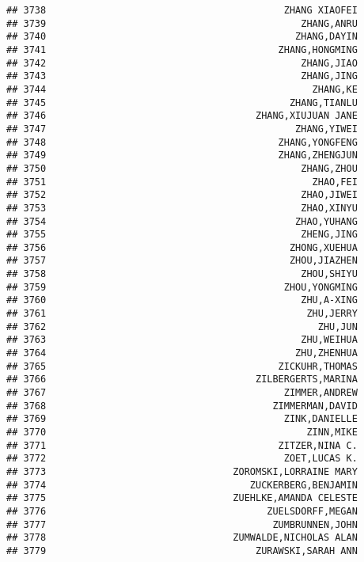 \documentclass[
]{article}
\begin{document}
\begin{verbatim}
## 3738                                          ZHANG XIAOFEI
## 3739                                             ZHANG,ANRU
## 3740                                            ZHANG,DAYIN
## 3741                                         ZHANG,HONGMING
## 3742                                             ZHANG,JIAO
## 3743                                             ZHANG,JING
## 3744                                               ZHANG,KE
## 3745                                           ZHANG,TIANLU
## 3746                                     ZHANG,XIUJUAN JANE
## 3747                                            ZHANG,YIWEI
## 3748                                         ZHANG,YONGFENG
## 3749                                         ZHANG,ZHENGJUN
## 3750                                             ZHANG,ZHOU
## 3751                                               ZHAO,FEI
## 3752                                             ZHAO,JIWEI
## 3753                                             ZHAO,XINYU
## 3754                                            ZHAO,YUHANG
## 3755                                             ZHENG,JING
## 3756                                           ZHONG,XUEHUA
## 3757                                           ZHOU,JIAZHEN
## 3758                                             ZHOU,SHIYU
## 3759                                          ZHOU,YONGMING
## 3760                                             ZHU,A-XING
## 3761                                              ZHU,JERRY
## 3762                                                ZHU,JUN
## 3763                                             ZHU,WEIHUA
## 3764                                            ZHU,ZHENHUA
## 3765                                         ZICKUHR,THOMAS
## 3766                                     ZILBERGERTS,MARINA
## 3767                                          ZIMMER,ANDREW
## 3768                                        ZIMMERMAN,DAVID
## 3769                                          ZINK,DANIELLE
## 3770                                              ZINN,MIKE
## 3771                                         ZITZER,NINA C.
## 3772                                          ZOET,LUCAS K.
## 3773                                 ZOROMSKI,LORRAINE MARY
## 3774                                    ZUCKERBERG,BENJAMIN
## 3775                                 ZUEHLKE,AMANDA CELESTE
## 3776                                       ZUELSDORFF,MEGAN
## 3777                                        ZUMBRUNNEN,JOHN
## 3778                                 ZUMWALDE,NICHOLAS ALAN
## 3779                                     ZURAWSKI,SARAH ANN

\end{verbatim}
\end{document}
